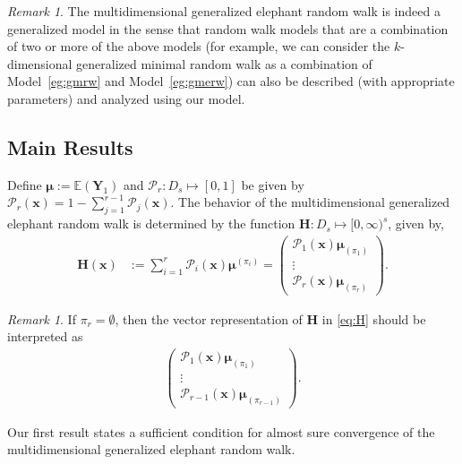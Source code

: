 \documentclass[12pt]{amsart}
\theoremstyle{plain}
\theoremstyle{remark}
\newtheorem{remark}[theorem]{Remark}
\numberwithin{equation}{section}
\begin{document}
\begin{remark}
    The multidimensional generalized elephant random walk is indeed a generalized model in the sense that random walk models that are a combination of two or more of the above models (for example, we can consider the $k$-dimensional generalized minimal random walk as a combination of Model~\ref{eg:gmrw} and Model~\ref{eg:gmerw}) can also be described (with appropriate parameters) and analyzed using our model. 
\end{remark}

\subsection{Main Results}\label{sec:main-results}

Define $\boldsymbol{\mu} := \mathbb{E}\left(\boldsymbol{Y}_1\right)$ and $\mathcal{P}_r : D_s \mapsto [0,1]$ be given by $\mathcal{P}_r(\boldsymbol{x}) =  1-\sum_{j=1}^{r-1}\mathcal{P}_j(\boldsymbol{x})$. The behavior of the multidimensional generalized elephant random walk is determined by the function $\boldsymbol{H}: D_s \mapsto [0,\infty)^s$, given by, 
\begin{align}\label{eq:H}
\boldsymbol{H}(\boldsymbol{x}) &:= 
\sum_{i=1}^{r}\mathcal{P}_i(\boldsymbol{x})\boldsymbol{\mu}^{(\pi_i)} 
= \begin{pmatrix}
    \mathcal{P}_1(\boldsymbol{x})\boldsymbol{\mu}_{(\pi_1)} \\ \vdots \\ \mathcal{P}_{r}(\boldsymbol{x})\boldsymbol{\mu}_{(\pi_{r})} 
\end{pmatrix}.
\end{align} 
\begin{remark}
    If $\pi_r = \emptyset$, then the vector representation of $\boldsymbol{H}$ in \eqref{eq:H} should be interpreted as 
\begin{align*}\begin{pmatrix}
    \mathcal{P}_1(\boldsymbol{x})\boldsymbol{\mu}_{(\pi_1)} \\ \vdots \\ \mathcal{P}_{r-1}(\boldsymbol{x})\boldsymbol{\mu}_{(\pi_{r-1})} 
\end{pmatrix}.
\end{align*}
\end{remark}
Our first result states a sufficient condition for almost sure convergence of the multidimensional generalized elephant random walk. 
\end{document}
